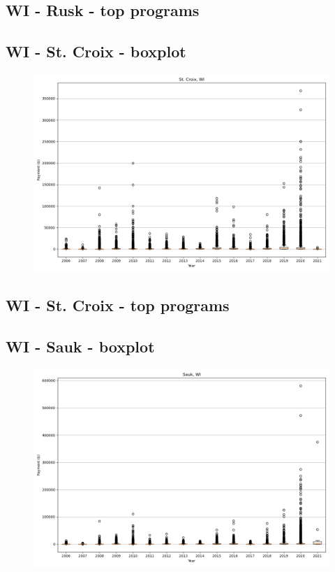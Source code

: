 \subsection*{WI - Rusk - top programs}

\newpage
\subsection*{WI - St. Croix - boxplot}
\begin{figure}[h]
\centering
\includegraphics[width=7in]{../output/boxplots/counties/St. Croix-WI_boxplot.png}
\end{figure}


\subsection*{WI - St. Croix - top programs}

\newpage
\subsection*{WI - Sauk - boxplot}
\begin{figure}[h]
\centering
\includegraphics[width=7in]{../output/boxplots/counties/Sauk-WI_boxplot.png}
\end{figure}


